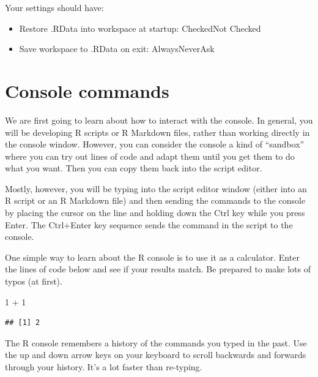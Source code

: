 \documentclass[
  oneside]{book}
\newenvironment{Shaded}{\begin{snugshade}}{\end{snugshade}}
\newcommand{\DecValTok}[1]{\textcolor[rgb]{0.00,0.00,0.81}{#1}}
\newcommand{\SpecialCharTok}[1]{\textcolor[rgb]{0.00,0.00,0.00}{#1}}
\providecommand{\tightlist}{%
  \setlength{\itemsep}{0pt}\setlength{\parskip}{0pt}}
\begin{document}
\begin{try}

Your settings should have:

\begin{itemize}
\tightlist
\item
  Restore .RData into workspace at startup: CheckedNot Checked
\item
  Save workspace to .RData on exit: AlwaysNeverAsk
\end{itemize}

\end{try}

\hypertarget{console}{%
\section{Console commands}\label{console}}

We are first going to learn about how to interact with the console. In general, you will be developing R scripts or R Markdown files, rather than working directly in the console window. However, you can consider the console a kind of ``sandbox'' where you can try out lines of code and adapt them until you get them to do what you want. Then you can copy them back into the script editor.

Mostly, however, you will be typing into the script editor window (either into an R script or an R Markdown file) and then sending the commands to the console by placing the cursor on the line and holding down the Ctrl key while you press Enter. The Ctrl+Enter key sequence sends the command in the script to the console.

One simple way to learn about the R console is to use it as a calculator. Enter the lines of code below and see if your results match. Be prepared to make lots of typos (at first).

\begin{Shaded}
\begin{Highlighting}[]
\DecValTok{1} \SpecialCharTok{+} \DecValTok{1}
\end{Highlighting}
\end{Shaded}

\begin{verbatim}
## [1] 2
\end{verbatim}

The R console remembers a history of the commands you typed in the past. Use the up and down arrow keys on your keyboard to scroll backwards and forwards through your history. It's a lot faster than re-typing.
\end{document}

